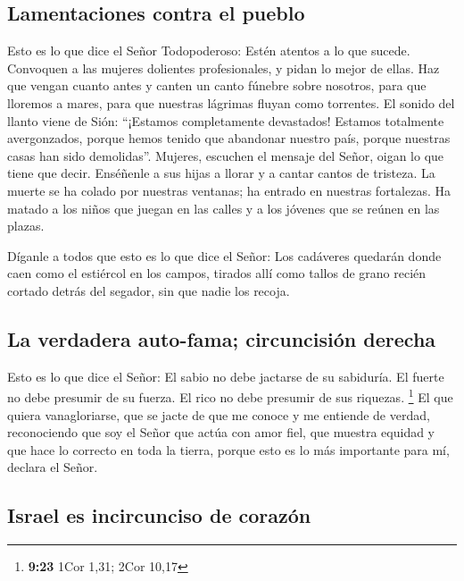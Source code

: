\hypertarget{lamentaciones-contra-el-pueblo}{%
\subsection{Lamentaciones contra el
pueblo}\label{lamentaciones-contra-el-pueblo}}

 Esto es lo que dice el Señor Todopoderoso: Estén atentos
a lo que sucede. Convoquen a las mujeres dolientes profesionales, y
pidan lo mejor de ellas.  Haz que vengan cuanto antes y
canten un canto fúnebre sobre nosotros, para que lloremos a mares, para
que nuestras lágrimas fluyan como torrentes.  El sonido
del llanto viene de Sión: ``¡Estamos completamente devastados! Estamos
totalmente avergonzados, porque hemos tenido que abandonar nuestro país,
porque nuestras casas han sido demolidas''.  Mujeres,
escuchen el mensaje del Señor, oigan lo que tiene que decir. Enséñenle a
sus hijas a llorar y a cantar cantos de tristeza.  La
muerte se ha colado por nuestras ventanas; ha entrado en nuestras
fortalezas. Ha matado a los niños que juegan en las calles y a los
jóvenes que se reúnen en las plazas.

 Díganle a todos que esto es lo que dice el Señor: Los
cadáveres quedarán donde caen como el estiércol en los campos, tirados
allí como tallos de grano recién cortado detrás del segador, sin que
nadie los recoja.

\hypertarget{la-verdadera-auto-fama-circuncisiuxf3n-derecha}{%
\subsection{La verdadera auto-fama; circuncisión
derecha}\label{la-verdadera-auto-fama-circuncisiuxf3n-derecha}}

 Esto es lo que dice el Señor: El sabio no debe jactarse
de su sabiduría. El fuerte no debe presumir de su fuerza. El rico no
debe presumir de sus riquezas. \footnote{\textbf{9:23} 1Cor 1,31; 2Cor
  10,17}  El que quiera vanagloriarse, que se jacte de
que me conoce y me entiende de verdad, reconociendo que soy el Señor que
actúa con amor fiel, que muestra equidad y que hace lo correcto en toda
la tierra, porque esto es lo más importante para mí, declara el Señor.

\hypertarget{israel-es-incircunciso-de-corazuxf3n}{%
\subsection{Israel es incircunciso de
corazón}\label{israel-es-incircunciso-de-corazuxf3n}}

